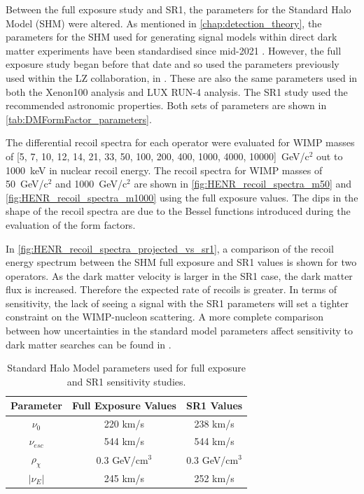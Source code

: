 \par
Between the full exposure study and SR1, the parameters for the Standard Halo Model (SHM) were altered.
As mentioned in \autoref{chap:detection_theory}, the parameters for the SHM used for generating signal models within direct dark matter experiments have been standardised since mid-2021 \cite{standard_halo_model_conventions_ref}.
However, the full exposure study began before that date and so used the parameters previously used within the LZ collaboration, in \cite{LZ_projected_sensitivity_paper_ref,LZ_TechnicalDesignReview_ref,LZ_Ibles_LZStats_Thesis_ref}.
These are also the same parameters used in both the Xenon100 analysis and LUX RUN-4 analysis.
The SR1 study used the recommended astronomic properties.
Both sets of parameters are shown in \autoref{tab:DMFormFactor_parameters}.

\par
The differential recoil spectra for each operator were evaluated for WIMP masses of [5, 7, 10, 12, 14, 21, 33, 50, 100, 200, 400, 1000, 4000, 10000]~GeV/c$^{2}$ out to 1000~keV in nuclear recoil energy.
The recoil spectra for WIMP masses of 50~GeV/c$^2$ and 1000~GeV/c$^2$ are shown in \autoref{fig:HENR_recoil_spectra_m50} and \autoref{fig:HENR_recoil_spectra_m1000} using the full exposure values.
The dips in the shape of the recoil spectra are due to the Bessel functions introduced during the evaluation of the form factors.

\par
In \autoref{fig:HENR_recoil_spectra_projected_vs_sr1}, a comparison of the recoil energy spectrum between the SHM full exposure and SR1 values is shown for two operators.
As the dark matter velocity is larger in the SR1 case, the dark matter flux is increased.
Therefore the expected rate of recoils is greater.
In terms of sensitivity, the lack of seeing a signal with the SR1 parameters will set a tighter constraint on the WIMP-nucleon scattering.
A more complete comparison between how uncertainties in the standard model parameters affect sensitivity to dark matter searches can be found in \cite{LZ_Ibles_LZStats_Thesis_ref,billyboxer_thesis_ref}.

\begin{table}[]
    \centering
    \begin{tabular}{c|c|c}
        Parameter         & Full Exposure Values   & SR1 Values       \\ \hline
        $\nu_0$           & 220 km/s           & 238 km/s         \\ 
        $\nu_{esc}$       & 544 km/s           & 544 km/s         \\
        $\rho_{\chi}$     & 0.3 GeV/cm$^{3}$   & 0.3 GeV/cm$^{3}$ \\
        $|\nu_E|$         & 245 km/s           & 252 km/s  
    \end{tabular}
    \caption{Standard Halo Model parameters used for full exposure and SR1 sensitivity studies.}
    \label{tab:DMFormFactor_parameters}
\end{table}


